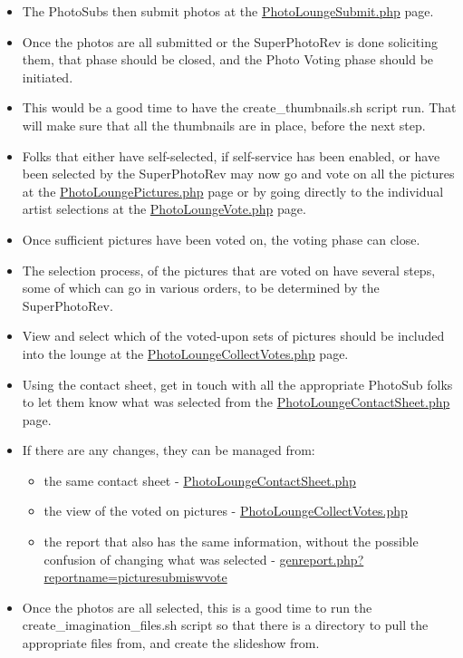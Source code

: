 \documentclass[captions=tablesignature]{scrartcl}
\begin{document}
\begin{itemize}
\item The PhotoSubs then submit photos at the \href{../webpages/PhotoLoungeSubmit.php}{PhotoLoungeSubmit.php}
page.
\item Once the photos are all submitted or the SuperPhotoRev is done
soliciting them, that phase should be closed, and the Photo Voting
phase should be initiated.
\item This would be a good time to have the create\_thumbnails.sh script
run.  That will make sure that all the thumbnails are in place,
before the next step.
\item Folks that either have self-selected, if self-service has been
enabled, or have been selected by the SuperPhotoRev may now go and
vote on all the pictures at the \href{../webpages/PhotoLoungePictures.php}{PhotoLoungePictures.php} page
or by going directly to the individual artist selections at the
\href{../webpages/PhotoLoungeVote.php}{PhotoLoungeVote.php} page.
\item Once sufficient pictures have been voted on, the voting phase can
close.
\item The selection process, of the pictures that are voted on have
several steps, some of which can go in various orders, to be
determined by the SuperPhotoRev.
\item View and select which of the voted-upon sets of pictures should be
included into the lounge at the \href{../webpages/PhotoLoungeCollectVotes.php}{PhotoLoungeCollectVotes.php} page.
\item Using the contact sheet, get in touch with all the appropriate
PhotoSub folks to let them know what was selected from the
\href{../webpages/PhotoLoungeContactSheet.php}{PhotoLoungeContactSheet.php} page.
\item If there are any changes, they can be managed from:
\begin{itemize}
\item the same contact sheet - \href{../webpages/PhotoLoungeContactSheet.php}{PhotoLoungeContactSheet.php}
\item the view of the voted on pictures - \href{../webpages/PhotoLoungeCollectVotes.php}{PhotoLoungeCollectVotes.php}
\item the report that also has the same information, without the
possible confusion of changing what was selected -
\href{../webpages/genreport.php?reportname=picturesubmiswvote}{genreport.php?reportname=picturesubmiswvote}
\end{itemize}
\item Once the photos are all selected, this is a good time to run the
create\_imagination\_files.sh script so that there is a directory to
pull the appropriate files from, and create the slideshow from.
\end{itemize}
\end{document}
